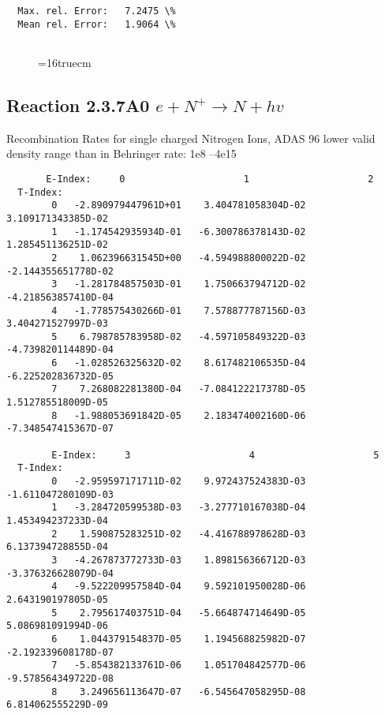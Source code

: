 \documentclass[12pt,dvipdfmx]{article}
\begin{document}
{\begin{small}
\begin{verbatim}
  Max. rel. Error:   7.2475 \%
  Mean rel. Error:   1.9064 \%


\end{verbatim}\end{small}
\begin{figure} \label{2.3.6A0}
\epsfxsize=16truecm
\end{figure}
\newpage
\subsection{
Reaction 2.3.7A0  $e + N^{+} \rightarrow N + hv$ }
 Recombination Rates for single  charged Nitrogen Ions, ADAS 96
 lower valid density range than in Behringer rate: 1e8 --4e15

\begin{small}\begin{verbatim}
       E-Index:     0                     1                     2
  T-Index:
        0   -2.890979447961D+01    3.404781058304D-02    3.109171343385D-02
        1   -1.174542935934D-01   -6.300786378143D-02    1.285451136251D-02
        2    1.062396631545D+00   -4.594988800022D-02   -2.144355651778D-02
        3   -1.281784857503D-01    1.750663794712D-02   -4.218563857410D-04
        4   -1.778575430266D-01    7.578877787156D-03    3.404271527997D-03
        5    6.798785783958D-02   -4.597105849322D-03   -4.739820114489D-04
        6   -1.028526325632D-02    8.617482106535D-04   -6.225202836732D-05
        7    7.268082281380D-04   -7.084122217378D-05    1.512785518009D-05
        8   -1.988053691842D-05    2.183474002160D-06   -7.348547415367D-07

        E-Index:     3                     4                     5
  T-Index:
        0   -2.959597171711D-02    9.972437524383D-03   -1.611047280109D-03
        1   -3.284720599538D-03   -3.277710167038D-04    1.453494237233D-04
        2    1.590875283251D-02   -4.416788978628D-03    6.137394728855D-04
        3   -4.267873772733D-03    1.898156366712D-03   -3.376326628079D-04
        4   -9.522209957584D-04    9.592101950028D-06    2.643190197805D-05
        5    2.795617403751D-04   -5.664874714649D-05    5.086981091994D-06
        6    1.044379154837D-05    1.194568825982D-07   -2.192339608178D-07
        7   -5.854382133761D-06    1.051704842577D-06   -9.578564349722D-08
        8    3.249656113647D-07   -6.545647058295D-08    6.814062555229D-09


\end{verbatim}
\end{small}}
\end{document}
